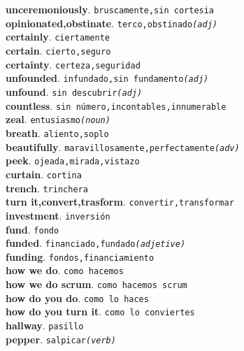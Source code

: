\documentclass[twocolumn]{article}
\begin{document}
	\textsf{\textbf{unceremoniously}}. \texttt{bruscamente,sin cortesia}\\
	\textsf{\textbf{opinionated,obstinate}}. \texttt{terco,obstinado{\scriptsize \textsl{(adj)}}}\\
	\textsf{\textbf{certainly}}. \texttt{ciertamente}\\
	\textsf{\textbf{certain}}. \texttt{cierto,seguro}\\
	\textsf{\textbf{certainty}}. \texttt{certeza,seguridad}\\
	\textsf{\textbf{unfounded}}. \texttt{infundado,sin fundamento{\scriptsize \textsl{(adj)}}}\\
	\textsf{\textbf{unfound}}. \texttt{sin descubrir{\scriptsize \textsl{(adj)}}}\\
	\textsf{\textbf{countless}}. \texttt{sin número,incontables,innumerable}\\
	\textsf{\textbf{zeal}}. \texttt{entusiasmo{\scriptsize \textsl{(noun)}}}\\
	\textsf{\textbf{breath}}. \texttt{aliento,soplo}\\
	\textsf{\textbf{beautifully}}. \texttt{maravillosamente,perfectamente{\scriptsize \textsl{(adv)}}}\\
	\textsf{\textbf{peek}}. \texttt{ojeada,mirada,vistazo}\\
	\textsf{\textbf{curtain}}. \texttt{cortina}\\
	\textsf{\textbf{trench}}. \texttt{trinchera}\\
	\textsf{\textbf{turn it,convert,trasform}}. \texttt{convertir,transformar}\\
	\textsf{\textbf{investment}}. \texttt{inversi\'on}\\
	\textsf{\textbf{fund}}. \texttt{fondo}\\
	\textsf{\textbf{funded}}. \texttt{financiado,fundado{\scriptsize \textsl{(adjetive)}}}\\
	\textsf{\textbf{funding}}. \texttt{fondos,financiamiento}\\
	\textsf{\textbf{how we do}}. \texttt{como hacemos}\\
	\textsf{\textbf{how we do scrum}}. \texttt{como hacemos scrum}\\
	\textsf{\textbf{how do you do}}. \texttt{como lo haces}\\
	\textsf{\textbf{how do you turn it}}. \texttt{como lo conviertes}\\
	\textsf{\textbf{hallway}}. \texttt{pasillo}\\
	\textsf{\textbf{pepper}}. \texttt{salpicar{\scriptsize \textsl{(verb)}}}\\
\end{document}
